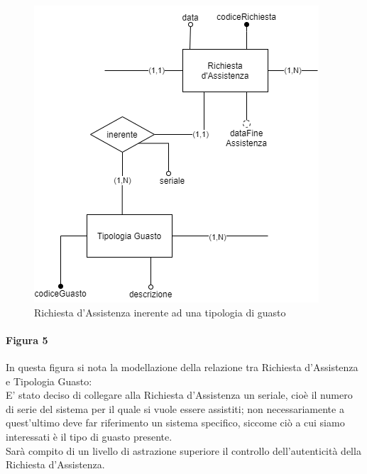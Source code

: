 \documentclass[legalpaper]{article}
\begin{document}
\begin{figure}[!ht]
	\centering
	\begin{minipage}[b]{0.4\textwidth}
		\includegraphics[width=\linewidth]{image/assistGuasto.png}
		\caption{Richiesta d'Assistenza inerente ad una tipologia di guasto}
		\label{fig:RichiestaInerenteGuasto}
	\end{minipage}
	\hfill
	
\end{figure}
\paragraph{Figura 5}
In questa figura si nota la modellazione della relazione tra Richiesta d'Assistenza e Tipologia Guasto:\\
E' stato deciso di collegare alla Richiesta d'Assistenza un seriale, cioè il numero di serie del sistema per il quale si vuole essere assistiti; non necessariamente a quest'ultimo deve far riferimento un sistema specifico, siccome ciò a cui siamo interessati è il tipo di guasto presente.\\
Sarà compito di un livello di astrazione superiore il controllo dell'autenticità della Richiesta d'Assistenza.\\ 
\end{document}

